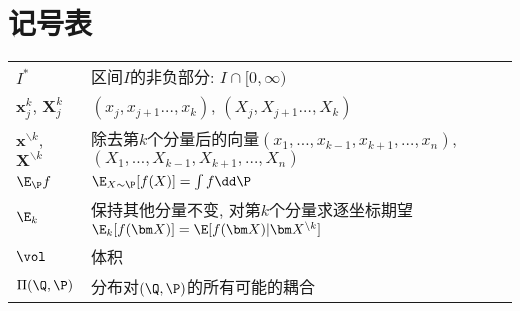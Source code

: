 \section*{记号表}

\begin{tabular}{p{} p{}}
\hline
	$I^*$ & 区间$I$的非负部分: $I \cap [0, \infty)$ \\
	$\bm x_j^k$, $\bm X_j^k$ & $(x_j, x_{j+1} \dots, x_k)$, $(X_j, X_{j+1} \dots, X_k)$ \\
	$\bm x^{\backslash k}$, $\bm X^{\backslash k}$ & 除去第$k$个分量后的向量$(x_1, \dots, x_{k-1}, x_{k+1}, \dots, x_n)$, $(X_1, \dots, X_{k-1}, X_{k+1}, \dots, X_n)$ \\
	$\E_{\P} f$ & $\E_{X \sim \P} [f(X)] = \int f \dd \P$ \\
	$\E_k$ & 保持其他分量不变, 对第$k$个分量求逐坐标期望$\E_k[f(\bm X)] = \E[f(\bm X) | \bm X^{\backslash k}]$ \\
	$\vol$ & 体积 \\
	$\Pi(\Q, \P)$ & 分布对$(\Q, \P)$的所有可能的耦合 \\
\hline
\end{tabular}
